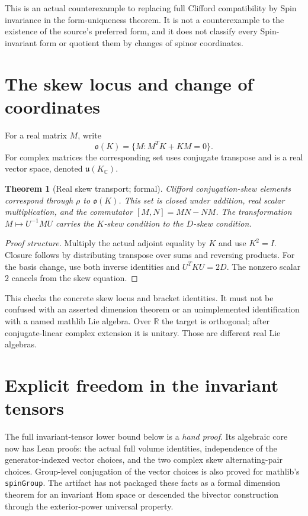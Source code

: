 \documentclass[11pt]{article}
\newtheorem{theorem}{Theorem}[section]
\newcommand{\R}{\mathbb R}
\newcommand{\C}{\mathbb C}
\begin{document}
This is an actual counterexample to replacing full Clifford compatibility by Spin invariance in the form-uniqueness theorem. It is not a counterexample to the existence of the source's preferred form, and it does not classify every Spin-invariant form or quotient them by changes of spinor coordinates.

\section{The skew locus and change of coordinates}
For a real matrix $M$, write
\[
 \mathfrak o(K)=\{M:M^TK+KM=0\}.
\]
For complex matrices the corresponding set uses conjugate transpose and is a real vector space, denoted $\mathfrak u(K_\C)$.

\begin{theorem}[Real skew transport; formal]
Clifford conjugation-skew elements correspond through $\rho$ to $\mathfrak o(K)$. This set is closed under addition, real scalar multiplication, and the commutator $[M,N]=MN-NM$. The transformation $M\mapsto U^{-1}MU$ carries the $K$-skew condition to the $D$-skew condition.
\end{theorem}
\begin{proof}[Proof structure]
Multiply the actual adjoint equality by $K$ and use $K^2=I$. Closure follows by distributing transpose over sums and reversing products. For the basis change, use both inverse identities and $U^TKU=2D$. The nonzero scalar $2$ cancels from the skew equation.
\end{proof}

This checks the concrete skew locus and bracket identities. It must not be confused with an asserted dimension theorem or an unimplemented identification with a named mathlib Lie algebra. Over $\R$ the target is orthogonal; after conjugate-linear complex extension it is unitary. Those are different real Lie algebras.

\section{Explicit freedom in the invariant tensors}
The full invariant-tensor lower bound below is a \emph{hand proof}. Its algebraic core now has Lean proofs: the actual full volume identities, independence of the generator-indexed vector choices, and the two complex skew alternating-pair choices. Group-level conjugation of the vector choices is also proved for mathlib's \texttt{spinGroup}. The artifact has not packaged these facts as a formal dimension theorem for an invariant Hom space or descended the bivector construction through the exterior-power universal property.
\end{document}
